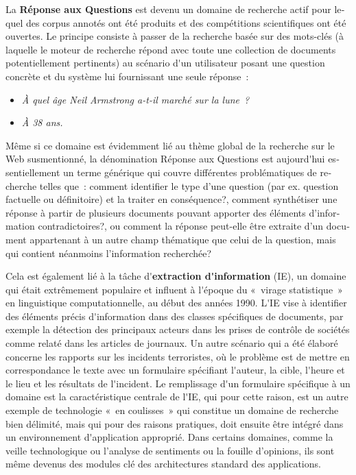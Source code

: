 \begin{french}
\begin{multicols}{2}
La {\bf Réponse aux Questions} est devenu un domaine de recherche actif pour
lequel des corpus annotés ont été produits et des compétitions
scientifiques ont été ouvertes. Le principe consiste à passer de la recherche
basée sur des mots-clés (à laquelle le moteur de recherche répond avec
toute une collection de documents potentiellement pertinents) au
scénario d{\mbox '}un utilisateur posant une question concrète et du système
lui fournissant une seule réponse~: 
\begin{itemize}
\item[] \textit{À quel âge Neil Armstrong a-t-il marché sur la lune~?}
\item[] \textit{À 38  ans.}
\end{itemize}
Même si ce domaine est évidemment lié au thème global de la recherche
sur le Web susmentionné, la dénomination Réponse aux Questions est
aujourd{\mbox '}hui essentiellement un terme générique qui couvre
différentes problématiques de recherche telles que~: comment
identifier le type d'une question (par ex. question factuelle ou
définitoire) et la traiter en conséquence?, comment synthétiser une
réponse à partir de plusieurs documents pouvant apporter des éléments
d'information contradictoires?, ou comment la réponse peut-elle être
extraite d'un document appartenant à un autre champ thématique que
celui de la question, mais qui contient néanmoins l'information
recherchée?

Cela est également lié à la tâche d{\mbox '}{\bf extraction d{\mbox '}information}
(IE), un domaine qui était extrêmement populaire et influent à
l{\mbox '}époque du «~virage statistique~» en linguistique computationnelle,
au début des années 1990. L{\mbox '}IE vise à identifier des éléments précis
d{\mbox '}information dans des classes spécifiques de documents, par exemple
la détection des principaux acteurs dans les prises de contrôle de
sociétés comme relaté dans les articles de journaux. Un autre scénario
qui a été élaboré concerne les rapports sur les incidents terroristes,
où le problème est de mettre en correspondance le texte avec un
formulaire spécifiant l{\mbox '}auteur, la cible, l{\mbox '}heure et le lieu et les
résultats de l{\mbox '}incident. Le remplissage d{\mbox '}un formulaire spécifique à
un domaine est la caractéristique centrale de l{\mbox '}IE, qui pour cette
raison, est un autre exemple de technologie «~en coulisses~» qui
constitue un domaine de recherche bien délimité, mais qui pour des
raisons pratiques, doit ensuite être intégré dans un environnement
d{\mbox '}application approprié. Dans certains domaines, comme la veille technologique ou
l'analyse de sentiments ou la fouille d'opinions, ils sont même devenus des modules clé des
architectures standard des applications.


\end{multicols}
\end{french}

